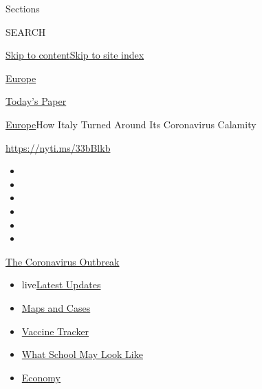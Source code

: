 Sections

SEARCH

\protect\hyperlink{site-content}{Skip to
content}\protect\hyperlink{site-index}{Skip to site index}

\href{https://www.nytimes3xbfgragh.onion/section/world/europe}{Europe}

\href{https://myaccount.nytimes3xbfgragh.onion/auth/login?response_type=cookie\&client_id=vi}{}

\href{https://www.nytimes3xbfgragh.onion/section/todayspaper}{Today's
Paper}

\href{/section/world/europe}{Europe}\textbar{}How Italy Turned Around
Its Coronavirus Calamity

\url{https://nyti.ms/33bBlkb}

\begin{itemize}
\item
\item
\item
\item
\item
\item
\end{itemize}

\href{https://www.nytimes3xbfgragh.onion/news-event/coronavirus?action=click\&pgtype=Article\&state=default\&region=TOP_BANNER\&context=storylines_menu}{The
Coronavirus Outbreak}

\begin{itemize}
\tightlist
\item
  live\href{https://www.nytimes3xbfgragh.onion/2020/08/01/world/coronavirus-covid-19.html?action=click\&pgtype=Article\&state=default\&region=TOP_BANNER\&context=storylines_menu}{Latest
  Updates}
\item
  \href{https://www.nytimes3xbfgragh.onion/interactive/2020/us/coronavirus-us-cases.html?action=click\&pgtype=Article\&state=default\&region=TOP_BANNER\&context=storylines_menu}{Maps
  and Cases}
\item
  \href{https://www.nytimes3xbfgragh.onion/interactive/2020/science/coronavirus-vaccine-tracker.html?action=click\&pgtype=Article\&state=default\&region=TOP_BANNER\&context=storylines_menu}{Vaccine
  Tracker}
\item
  \href{https://www.nytimes3xbfgragh.onion/interactive/2020/07/29/us/schools-reopening-coronavirus.html?action=click\&pgtype=Article\&state=default\&region=TOP_BANNER\&context=storylines_menu}{What
  School May Look Like}
\item
  \href{https://www.nytimes3xbfgragh.onion/live/2020/07/31/business/stock-market-today-coronavirus?action=click\&pgtype=Article\&state=default\&region=TOP_BANNER\&context=storylines_menu}{Economy}
\end{itemize}

